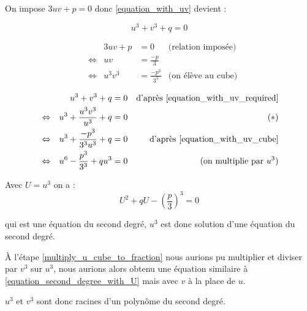 \documentclass[]{../templates/homework}
\begin{document}
\question On impose $3uv + p = 0$ donc \eqref{equation_with_uv} devient :

\begin{equation*}
	u^3 + v^3 + q = 0 \tag{$E_3$} \label{equation_with_uv_required}
\end{equation*}

\question

\begin{align*}
	 &                 & 3uv + p & = 0                & \text{(relation imposée)}                                           \\
	 & \Leftrightarrow & uv      & = \frac{-p}{3}     &                                                                     \\
	 & \Leftrightarrow & u^3v^3  & = \frac{-p^3}{3^3} & \text{(on élève au cube)} \tag{$E_4$} \label{equation_with_uv_cube}
\end{align*}

\question

\begin{align*}
	 &                 & u^3 + v^3 + q                 & = 0 & \text{d'après \eqref{equation_with_uv_required}} \\
	 & \Leftrightarrow & u^3 + \frac{u^3v^3}{u^3} + q  & = 0 & \tag{$\ast$} \label{multiply_u_cube_to_fraction} \\
	 & \Leftrightarrow & u^3 + \frac{-p^3}{3^3u^3} + q & = 0 & \text{d'après \eqref{equation_with_uv_cube}}     \\
	 & \Leftrightarrow & u^6 - \frac{p^3}{3^3} + qu^3  & = 0 & \text{(on multiplie par $u^3$)}
\end{align*}

Avec $U = u^3$ on a :
\begin{equation}
	\tag{$E_5$}
	U^2 + qU - \left(\frac{p}{3}\right)^3 = 0
	\label{equation_second_degree_with_U}
\end{equation}

qui est une équation du second degré, $u^3$ est donc solution d'une équation du second degré.

À l'étape \eqref{multiply_u_cube_to_fraction} nous aurions pu multiplier et diviser par $v^3$ sur $u^3$, nous aurions alors obtenu une équation similaire à \eqref{equation_second_degree_with_U} mais avec $v$ à la place de $u$.

$u^3$ et $v^3$ sont donc racines d'un polynôme du second degré.
\end{document}
